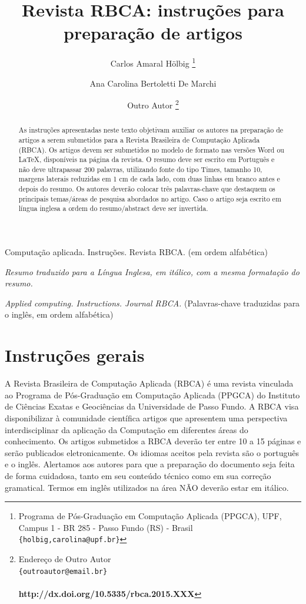 \documentclass{RBCA}
\title{Revista RBCA: instruções para preparação de artigos}
\author
{
 Carlos Amaral Hölbig
   \footnote{Programa de Pós-Graduação em Computação Aplicada (PPGCA), UPF, Campus 1 - BR 285 - Passo Fundo (RS) - Brasil\\
   \texttt{\{holbig,carolina@upf.br\}}}
 \and
 Ana Carolina Bertoletti De Marchi
   \footnotemark[1]
   \and
Outro Autor
   \footnote{Endereço de Outro Autor\\
   \texttt{\{outroautor@email.br\}}\\ \\ \textbf{http://dx.doi.org/10.5335/rbca.2015.XXX}}
}
\begin{document}

\maketitle
\thispagestyle{fancy}
\vspace{6pt}

\begin{abstract}
As instruções apresentadas neste texto objetivam auxiliar os autores na
preparação de artigos a serem submetidos para a Revista Brasileira de
Computação Aplicada (RBCA). Os artigos devem ser submetidos no modelo de
formato nas versões Word ou \LaTeX, disponíveis na página da revista. O resumo deve ser escrito
em Português e não deve ultrapassar 200 palavras, utilizando fonte do tipo Times,
tamanho 10, margens laterais reduzidas em 1 cm de cada lado, com duas linhas
em branco antes e depois do resumo. Os autores deverão colocar três palavras-chave
que destaquem os principais temas/áreas de pesquisa abordados no artigo. Caso o artigo seja escrito em língua inglesa a ordem do resumo/abstract deve ser invertida.
\end{abstract}

\begin{keywords}
Computação aplicada. Instruções. Revista RBCA. (em ordem alfabética)
\end{keywords}

\vspace{6pt}

\begin{abstractinenglish}
\emph{Resumo traduzido para a Língua Inglesa, em itálico, com a mesma formatação do resumo.}
\end{abstractinenglish}

\begin{keywordsenglish}
\emph{Applied computing. Instructions. Journal RBCA.} (Palavras-chave traduzidas para o inglês, em ordem alfabética)
\end{keywordsenglish}

\section{Instruções gerais}
A Revista Brasileira de Computação Aplicada (RBCA) é uma revista vinculada ao Programa de Pós-Graduação em Computação Aplicada (PPGCA) do Instituto de Ciências Exatas e Geociências da Universidade de Passo Fundo. A RBCA visa disponibilizar à comunidade científica artigos que apresentem uma perspectiva interdisciplinar da aplicação da Computação em diferentes áreas do conhecimento. Os artigos submetidos a RBCA deverão ter entre 10 a 15 páginas e serão publicados eletronicamente. Os idiomas aceitos pela revista são o português e o inglês. Alertamos aos autores para que a preparação do documento seja feita de forma cuidadosa, tanto em seu conteúdo técnico como em sua correção gramatical. Termos em inglês utilizados na área NÃO deverão estar em itálico.
\end{document}
